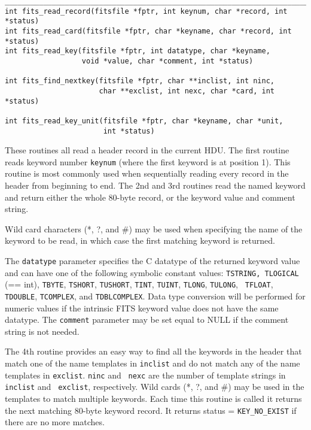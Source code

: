 \documentclass[11pt]{article}
\begin{document}
\begin{verbatim}
___________________________________________________________________________
int fits_read_record(fitsfile *fptr, int keynum, char *record, int *status)
int fits_read_card(fitsfile *fptr, char *keyname, char *record, int *status)
int fits_read_key(fitsfile *fptr, int datatype, char *keyname,
                  void *value, char *comment, int *status)

int fits_find_nextkey(fitsfile *fptr, char **inclist, int ninc,
                      char **exclist, int nexc, char *card, int *status)

int fits_read_key_unit(fitsfile *fptr, char *keyname, char *unit, 
                       int *status)
\end{verbatim}

These routines all read a header record in the current HDU. The first
routine reads keyword number {\tt keynum} (where the first keyword is
at position 1).  This routine is most commonly used when sequentially
reading every record in the header from beginning to end.  The 2nd and
3rd routines read the named keyword and return either the whole
80-byte record, or the keyword value and comment string.

Wild card characters (*, ?, and \#) may be used when specifying the name
of the keyword to be read, in which case the first matching keyword is
returned.

The {\tt datatype} parameter specifies the C datatype of the returned
keyword value and can have one of the following symbolic constant
values:  {\tt TSTRING, TLOGICAL} (== int), {\tt TBYTE}, {\tt TSHORT},
{\tt TUSHORT}, {\tt TINT}, {\tt TUINT}, {\tt TLONG}, {\tt TULONG}, {\tt
TFLOAT}, {\tt TDOUBLE}, {\tt TCOMPLEX}, and {\tt TDBLCOMPLEX}.  Data
type conversion will be performed for numeric values if the intrinsic
FITS keyword value does not have the same datatype.  The {\tt comment}
parameter may be set equal to NULL if the comment string is not
needed.

The 4th routine provides an easy way to find all the keywords in the
header that match one of the name templates in {\tt inclist} and do not
match any of the name templates in {\tt exclist}.  {\tt ninc} and {\tt
nexc} are the number of template strings in {\tt inclist} and {\tt
exclist}, respectively.  Wild cards (*, ?, and \#) may be used in the
templates to match multiple keywords.  Each time this routine is called
it returns the next matching 80-byte keyword record.  It returns status
= {\tt KEY\_NO\_EXIST} if there are no more matches.
\end{document}
